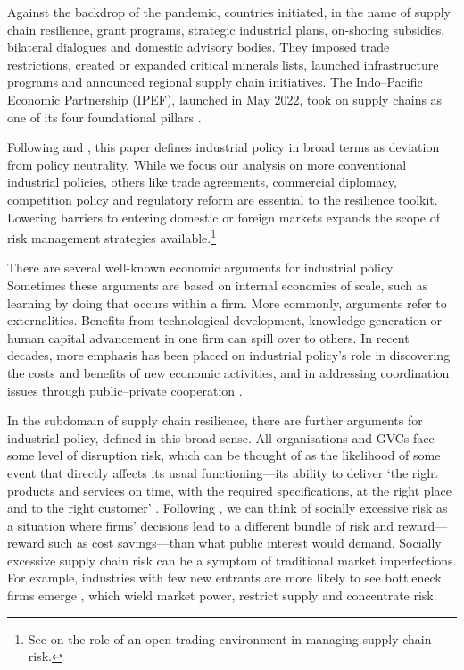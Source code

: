\documentclass{article}
\begin{document}
Against the backdrop of the pandemic, countries initiated, in the name of supply chain resilience, grant programs, strategic industrial plans, on-shoring subsidies, bilateral dialogues and domestic advisory bodies. They imposed trade restrictions, created or expanded critical minerals lists, launched infrastructure programs and announced regional supply chain initiatives. The Indo--Pacific Economic Partnership (IPEF), launched in May 2022, took on supply chains as one of its four foundational pillars \parencite{hardwick_policy_2024}.

Following \textcite{harrison_trade_2010} and \textcite{bown_modern_2024}, this paper defines industrial policy in broad terms as deviation from policy neutrality. While we focus our analysis on more conventional industrial policies, others like trade agreements, commercial diplomacy, competition policy and regulatory reform are essential to the resilience toolkit. Lowering barriers to entering domestic or foreign markets expands the scope of risk management strategies available.\footnote{See \textcite[145--148]{productivity_commission_vulnerable_2021} on the role of an open trading environment in managing supply chain risk.}

There are several well-known economic arguments for industrial policy. Sometimes these arguments are based on internal economies of scale, such as learning by doing that occurs within a firm. More commonly, arguments refer to externalities. Benefits from technological development, knowledge generation or human capital advancement in one firm can spill over to others. In recent decades, more emphasis has been placed on industrial policy's role in discovering the costs and benefits of new economic activities, and in addressing coordination issues through public--private cooperation \parencite{rodrik_industrial_2004}.

In the subdomain of supply chain resilience, there are further arguments for industrial policy, defined in this broad sense. All organisations and GVCs face some level of disruption risk, which can be thought of as the likelihood of some event that directly affects its usual functioning---its ability to deliver `the right products and services on time, with the required specifications, at the right place and to the right customer' \parencite{carvalho_supply_2012}. Following \textcite{baldwin_risks_2022}, we can think of socially excessive risk as a situation where firms' decisions lead to a different bundle of risk and reward---reward such as cost savings---than what public interest would demand. Socially excessive supply chain risk can be a symptom of traditional market imperfections. For example, industries with few new entrants are more likely to see bottleneck firms emerge \parencite{carvalho_supply_nodate}, which wield market power, restrict supply and concentrate risk.
\end{document}

